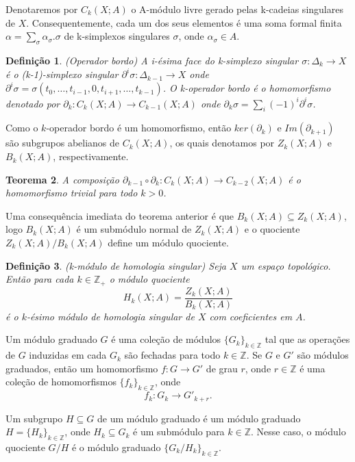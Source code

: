 \documentclass[12pt]{book}
\newtheorem{teorema}{Teorema}[section]
\newtheorem{definicao}[teorema]{Definição}
\newcommand{\bordo}[1]{\partial_{#1}}
\newcommand{\cadeia}[2]{C_{#1}(#2; A)}
\newcommand{\colecao}[1]{\{#1_{k} \}_{k\in \inteiros}}
\newcommand{\homologia}[2]{H_{#1}(#2;A)}
\newcommand{\imagembordo}[2]{B_{#1}(#2;A)}
\newcommand{\inteiros}{\mathbb{Z}}
\newcommand{\inteirospos}{\inteiros_{+}}
\newcommand{\kernelbordo}[2]{Z_{#1}(#2;A)}
\begin{document}
	Denotaremos por $\cadeia{k}{X}$ o A-módulo livre gerado pelas k-cadeias singulares de $X$. Consequentemente, cada um dos seus elementos é uma soma formal finita $\alpha = \sum_{\sigma} \alpha_{\sigma}.\sigma $ de k-simplexos singulares $\sigma$, onde $\alpha_{\sigma} \in A$.
	
	\begin{definicao}
		(Operador bordo) A i-ésima face do k-simplexo singular $\sigma: \Delta_{k} \to X$ é o (k-1)-simplexo singular $\partial^{i}\sigma:\Delta_{k-1} \to X$ onde $\partial^{i}\sigma = \sigma(t_{0}, \dots, t_{i-1},0,t_{i+1}, \dots, t_{k-1})$. O k-operador bordo é o homomorfismo denotado por $\bordo{k}: \cadeia{k}{X} \to \cadeia{k-1}{X}$ onde $\bordo{k}\sigma = \sum_{i} (-1)^{i}\partial^{i}\sigma$.
	\end{definicao}
	
	Como o $k$-operador bordo é um homomorfismo, então $ker(\bordo{k})$ e $Im(\bordo{k+1})$ são subgrupos abelianos de $\cadeia{k}{X}$, os quais denotamos por $\kernelbordo{k}{X}$ e $\imagembordo{k}{X}$, respectivamente.
	
	\begin{teorema}
		A composição $\bordo{k-1}\circ\bordo{k}: \cadeia{k}{X} \to \cadeia{k-2}{X}$ é o homomorfismo trivial para todo $k>0$.
	\end{teorema}
	
	Uma consequência imediata do teorema anterior é que $\imagembordo{k}{X} \subseteq \kernelbordo{k}{X}$, logo $\imagembordo{k}{X}$ é um submódulo normal de $\kernelbordo{k}{X}$ e o quociente $\kernelbordo{k}{X}/\imagembordo{k}{X}$ define um módulo quociente.
	
	\begin{definicao}
		(k-módulo de homologia singular) Seja $X$ um espaço topológico. Então para cada $k \in \inteirospos$ o módulo quociente
		$$
		\homologia{k}{X} = \frac{\kernelbordo{k}{X}}{\imagembordo{k}{X}}
		$$
		é o $k$-ésimo módulo de homologia singular de $X$ com coeficientes em $A$.
	\end{definicao}
	
	Um módulo graduado $G$ é uma coleção de módulos $\colecao{G}$ tal que as operações de $G$ induzidas em cada $G_{k}$ são fechadas para todo $k \in \inteiros$. Se $G$ e $G'$ são módulos graduados, então um homomorfismo $f:G\to G'$ de grau $r$, onde $r \in \inteiros$ é uma coleção de homomorfismos $\colecao{f}$, onde 
	$$
	f_{k}:G_{k}\to G'_{k+r}.
	$$
	
	Um subgrupo $H\subseteq G$ de um módulo graduado é um módulo graduado $H=\colecao{H}$, onde $H_{k} \subseteq G_{k}$ é um submódulo para $k \in \inteiros$. Nesse caso, o módulo quociente $G/H$ é o módulo graduado $\{G_{k}/H_{k} \}_{k\in \inteiros}$.
	
\end{document}
